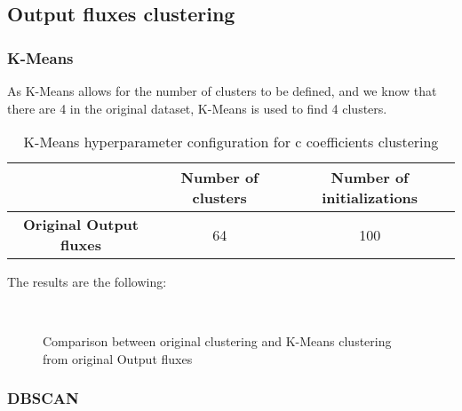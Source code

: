 	\subsection{Output fluxes clustering}

		\subsubsection{K-Means}
			
			As K-Means allows for the number of clusters to be defined, and we know that there are 4 in the original dataset, K-Means is used to find 4 clusters.
			
			\begin{table}[h!]
				\centering
				\begin{tabular}{|c|c|c|}
					\hline
					& \textbf{Number of clusters} & \textbf{Number of initializations}\\
					\hline
					\textbf{Original Output fluxes} & 64 & 100\\
					\hline
				\end{tabular}
				\caption{K-Means hyperparameter configuration for c coefficients clustering}
			\end{table}
		
			The results are the following:
			
			\begin{figure*}[ht!]
				\centering
				\hspace{\fill}
				\\
					
				\hspace{\fill}
				\caption{Comparison between original clustering and K-Means clustering from original Output fluxes}
			\end{figure*}
			\FloatBarrier
		
		\subsubsection{DBSCAN}
			
